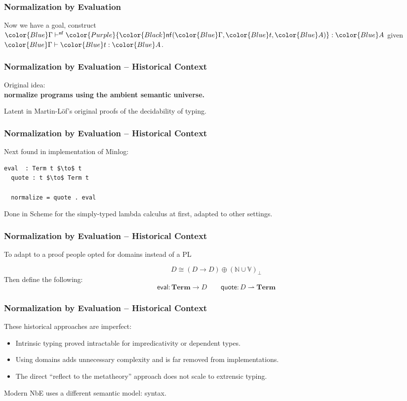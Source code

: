 \documentclass[svgnames]{beamer}
\newcommand\fmttm[1]{{\color{Blue}#1}}
\newcommand\fmtnf[1]{{\color{Purple}#1}}
\newcommand{\Term}{\mathbf{Term}}
\newcommand{\pto}{\rightharpoonup}
\newcommand{\isterm}[3]{\fmttm{#1}\vdash\fmttm{#2}:\fmttm{#3}}
\newcommand{\isnormal}[3]{\fmttm{#1}\vdash^{\mathsf{nf}}\fmtnf{#2}:\fmttm{#3}}
\newcommand{\nf}[3]{{\color{Black} \mathsf{nf}(\fmttm{#1}, \fmttm{#2}, \fmttm{#3})}}
\begin{document}
\begin{frame}
  \frametitle{Normalization by Evaluation}
  \centering
  Now we have a goal, construct $\isnormal{\Gamma}{\nf{\Gamma}{t}{A}}{A}$ given $\isterm{\Gamma}{t}{A}$.
\end{frame}
\begin{frame}
  \frametitle{Normalization by Evaluation -- Historical Context}
  \centering
  Original idea:\\ \textbf{normalize programs using the ambient semantic universe.}

  \bigskip

  Latent in Martin-L\"of's original proofs of the decidability of typing.
\end{frame}

\begin{frame}[fragile]
  \frametitle{Normalization by Evaluation -- Historical Context}
  Next found in implementation of Minlog:
\begin{lstlisting}[mathescape=true]
  eval  : Term t $\to$ t
  quote : t $\to$ Term t

  normalize = quote . eval
\end{lstlisting}
  Done in Scheme for the simply-typed lambda calculus at first, adapted to other settings.
\end{frame}

\begin{frame}[fragile]
  \frametitle{Normalization by Evaluation -- Historical Context}
  \begin{centering}
    To adapt to a proof people opted for domains instead of a PL
  \end{centering}
  \[
    D \cong (D \to D) \oplus (\mathbb{N} \cup \mathbb{V})_\bot
  \]
  Then define the following:
  \[
    \mathsf{eval} : \Term \to D \qquad \mathsf{quote} : D \pto \Term
  \]
\end{frame}

\begin{frame}
  \frametitle{Normalization by Evaluation -- Historical Context}
  These historical approaches are imperfect:
  \begin{itemize}
  \item Intrinsic typing proved intractable for impredicativity or dependent types.
  \item Using domains adds unnecessary complexity and is far removed from implementations.
  \item The direct ``reflect to the metatheory'' approach does not scale to extrensic typing.
  \end{itemize}

  \pause
  \bigskip

  Modern NbE uses a different semantic model: syntax.
\end{frame}
\end{document}
